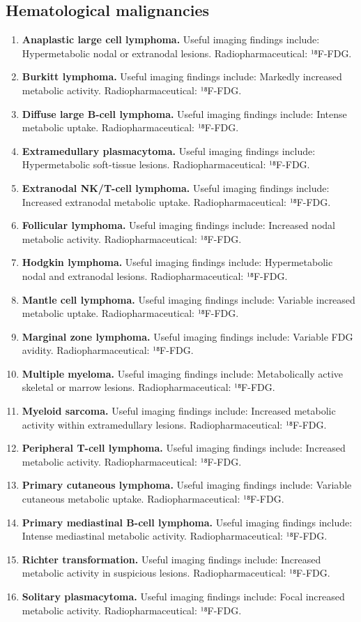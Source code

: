 \subsection{Hematological malignancies}
\begin{enumerate}[leftmargin=*,itemsep=0.45em,topsep=0.4em]
\item \textbf{Anaplastic large cell lymphoma.} Useful imaging findings include: Hypermetabolic nodal or extranodal lesions. Radiopharmaceutical: ¹⁸F-FDG.
\item \textbf{Burkitt lymphoma.} Useful imaging findings include: Markedly increased metabolic activity. Radiopharmaceutical: ¹⁸F-FDG.
\item \textbf{Diffuse large B-cell lymphoma.} Useful imaging findings include: Intense metabolic uptake. Radiopharmaceutical: ¹⁸F-FDG.
\item \textbf{Extramedullary plasmacytoma.} Useful imaging findings include: Hypermetabolic soft-tissue lesions. Radiopharmaceutical: ¹⁸F-FDG.
\item \textbf{Extranodal NK/T-cell lymphoma.} Useful imaging findings include: Increased extranodal metabolic uptake. Radiopharmaceutical: ¹⁸F-FDG.
\item \textbf{Follicular lymphoma.} Useful imaging findings include: Increased nodal metabolic activity. Radiopharmaceutical: ¹⁸F-FDG.
\item \textbf{Hodgkin lymphoma.} Useful imaging findings include: Hypermetabolic nodal and extranodal lesions. Radiopharmaceutical: ¹⁸F-FDG.
\item \textbf{Mantle cell lymphoma.} Useful imaging findings include: Variable increased metabolic uptake. Radiopharmaceutical: ¹⁸F-FDG.
\item \textbf{Marginal zone lymphoma.} Useful imaging findings include: Variable FDG avidity. Radiopharmaceutical: ¹⁸F-FDG.
\item \textbf{Multiple myeloma.} Useful imaging findings include: Metabolically active skeletal or marrow lesions. Radiopharmaceutical: ¹⁸F-FDG.
\item \textbf{Myeloid sarcoma.} Useful imaging findings include: Increased metabolic activity within extramedullary lesions. Radiopharmaceutical: ¹⁸F-FDG.
\item \textbf{Peripheral T-cell lymphoma.} Useful imaging findings include: Increased metabolic activity. Radiopharmaceutical: ¹⁸F-FDG.
\item \textbf{Primary cutaneous lymphoma.} Useful imaging findings include: Variable cutaneous metabolic uptake. Radiopharmaceutical: ¹⁸F-FDG.
\item \textbf{Primary mediastinal B-cell lymphoma.} Useful imaging findings include: Intense mediastinal metabolic activity. Radiopharmaceutical: ¹⁸F-FDG.
\item \textbf{Richter transformation.} Useful imaging findings include: Increased metabolic activity in suspicious lesions. Radiopharmaceutical: ¹⁸F-FDG.
\item \textbf{Solitary plasmacytoma.} Useful imaging findings include: Focal increased metabolic activity. Radiopharmaceutical: ¹⁸F-FDG.
\end{enumerate}

